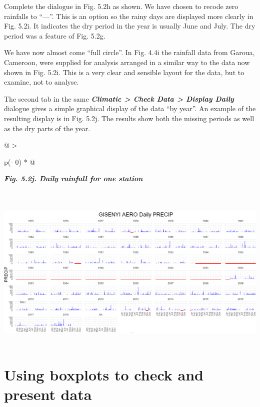 \documentclass[
  letterpaper,
  DIV=11,
  numbers=noendperiod]{scrreprt}
\begin{document}
Complete the dialogue in Fig. 5.2h as shown. We have chosen to recode
zero rainfalls to ``---''. This is an option so the rainy days are
displayed more clearly in Fig. 5.2i. It indicates the dry period in the
year is usually June and July. The dry period was a feature of Fig.
5.2g.

We have now almost come ``full circle''. In Fig. 4.4i the rainfall data
from Garoua, Cameroon, were supplied for analysis arranged in a similar
way to the data now shown in Fig. 5.2i. This is a very clear and
sensible layout for the data, but to examine, not to analyse.

The second tab in the same \textbf{\emph{Climatic \textgreater{} Check
Data \textgreater{} Display Daily}} dialogue gives a simple graphical
display of the data ``by year''. An example of the resulting display is
in Fig. 5.2j. The results show both the missing periods as well as the
dry parts of the year.

\begin{longtable}[]{@{}
  >{\raggedright\arraybackslash}p{(\columnwidth - 0\tabcolsep) * }@{}}
\toprule\noalign{}
\begin{minipage}[b]{\linewidth}\raggedright
\textbf{\emph{Fig. 5.2j. Daily rainfall for one station}}
\end{minipage} \\
\midrule\noalign{}
\endhead
\bottomrule\noalign{}
\endlastfoot
\includegraphics[width=6.10592in,height=2.96705in]{figures/Fig5.2j.png} \\
\end{longtable}

\section{Using boxplots to check and present
data}\label{using-boxplots-to-check-and-present-data}
\end{document}
